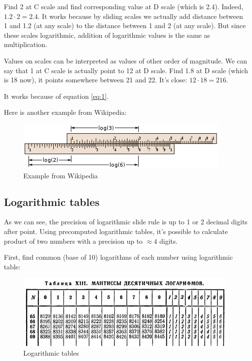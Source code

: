 
Find 2 at C scale and find corresponding value at D scale (which is 2.4).
Indeed, $1.2 \cdot 2 = 2.4$.
It works because by sliding scales we actually add distance between 1 and 1.2 (at any scale) to the distance between 1 and 2 (at any scale).
But since these scales logarithmic, addition of logarithmic values is the same as multiplication.

Values on scales can be interpreted as values of other order of magnitude.
We can say that 1 at C scale is actually point to 12 at D scale.
Find 1.8 at D scale (which is 18 now), it points somewhere between 21 and 22.
It's close: $12 \cdot 18 = 216$.

It works because of equation \ref{eq:1}.

Here is another example from Wikipedia:

\begin{figure}[H]
\centering
\includegraphics[scale=0.66]{log/403px-Slide_rule_example2_with_labels.svg.png}
\caption{Example from Wikipedia}
\end{figure}

\subsection{Logarithmic tables}

As we can see, the precision of logarithmic slide rule is up to 1 or 2 decimal digits after point.
Using precomputed logarithmic tables, it's possible to calculate product of two numbers with a precision up to $\approx 4$ digits.

First, find common (base of 10) logarithms of each number using logarithmic table:

\begin{figure}[H]
\centering
\includegraphics[scale=0.66]{log/bradis1.jpg}
\caption{Logarithmic tables}
\end{figure}

